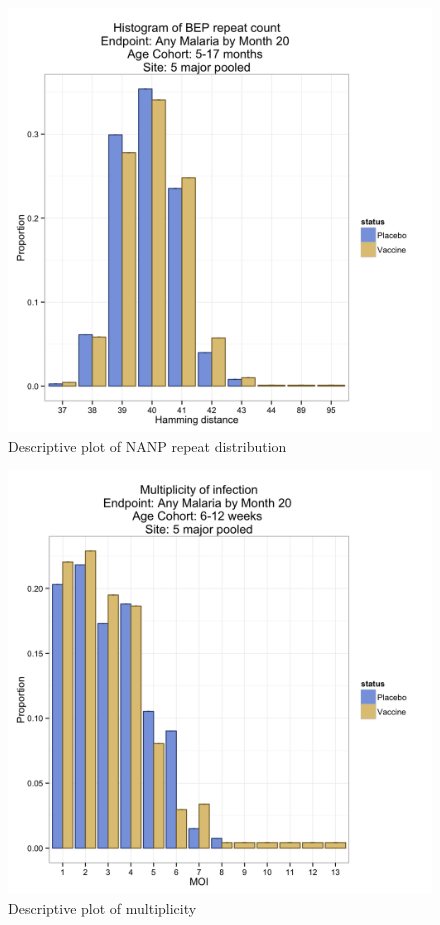 \documentclass[]{article}
\begin{document}
\begin{figure}[htbp]
\centering
\includegraphics{figures/bep-hist-infant-c-1.png}
\caption{Descriptive plot of NANP repeat distribution}
\end{figure}

\begin{figure}[htbp]
\centering
\includegraphics{figures/moi-newborn-x-1.png}
\caption{Descriptive plot of multiplicity}
\end{figure}
\end{document}
